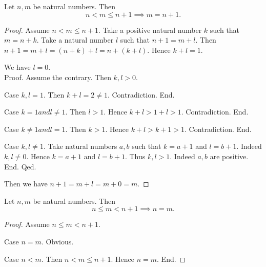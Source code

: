 \documentclass[../arithmetic.tex]{subfiles}
\begin{document}
  \begin{forthel}
    \begin{proposition}
      Let $n, m$ be natural numbers.
      Then \[ n < m \leq n + 1 \implies m = n + 1. \]
    \end{proposition}
    \begin{proof}
      Assume $n < m \leq n + 1$.
      Take a positive natural number $k$ such that $m = n + k$.
      Take a natural number $l$ such that $n + 1 = m + l$.
      Then $n + 1
        = m + l
        = (n + k) + l
        = n + (k + l)$.
      Hence $k + l = 1$.

      We have $l = 0$. \\
      Proof.
        Assume the contrary.
        Then $k,l > 0$.

        Case $k,l = 1$.
          Then $k + l
            = 2
            \neq 1$.
          Contradiction.
        End.

        Case $k = 1 and l \neq 1$.
          Then $l > 1$.
          Hence $k + l
            > 1 + l
            > 1$.
          Contradiction.
        End.

        Case $k \neq 1 and l = 1$.
          Then $k > 1$.
          Hence $k + l
            > k + 1
            > 1$.
          Contradiction.
        End.

        Case $k, l \neq 1$.
          Take natural numbers $a, b$ such that $k = a + 1$ and $l = b + 1$.
          Indeed $k, l \neq 0$.
          Hence $k = a + 1$ and $l = b + 1$.
          Thus $k, l > 1$. Indeed $a, b$ are positive.
        End.
      Qed.

      Then we have $n + 1
        = m + l
        = m + 0
        = m$.
    \end{proof}
  \end{forthel}

  \begin{forthel}
    \begin{proposition}
      Let $n, m$ be natural numbers.
      Then \[ n \leq m < n + 1 \implies n = m. \]
    \end{proposition}
    \begin{proof}
      Assume $n \leq m < n + 1$.

      Case $n = m$. Obvious.

      Case $n < m$.
        Then $n < m \leq n + 1$.
        Hence $n = m$.
      End.
    \end{proof}
  \end{forthel}
\end{document}
